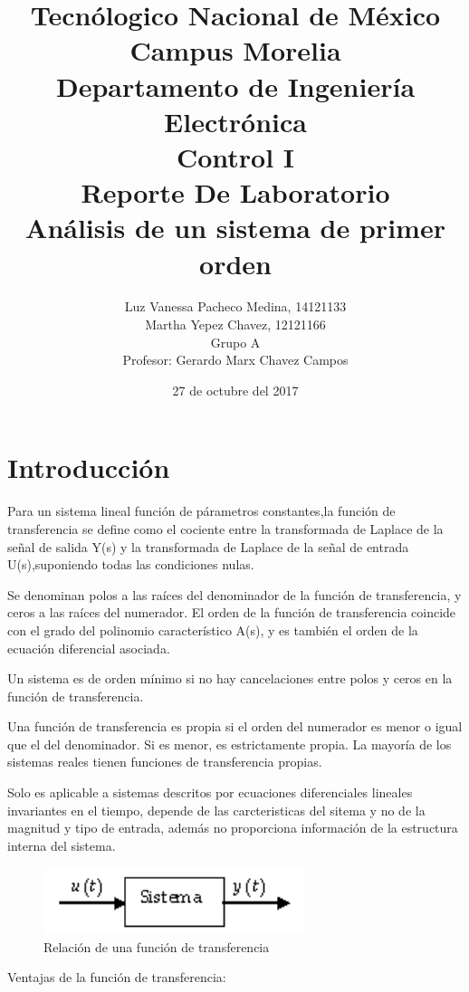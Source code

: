 \documentclass[12pt,letterpaper]{article}     %
\author{Luz Vanessa Pacheco Medina, 14121133 \\ Martha Yepez Chavez, 12121166 \\ {\small Grupo A}\\ Profesor: Gerardo Marx Chavez Campos  \vspace*{3.0in}}
\title{Tecnólogico Nacional de México\\Campus Morelia\\{\small Departamento de Ingeniería Electrónica\\Control I\\\vspace*{0.55in} Reporte De Laboratorio}\\ Análisis de un sistema de primer orden \vspace*{1.35in}}
\date{27 de octubre del 2017}
\begin{document}


\maketitle							%


\tableofcontents
\newpage
\listoffigures

\newpage
\section{Introducción}
Para un sistema lineal función de párametros constantes,la función de transferencia se define como el cociente entre la transformada de Laplace de la señal de salida Y(s) y  la transformada de Laplace de la señal de entrada U(s),suponiendo todas las condiciones nulas. 



Se denominan polos a las raíces del denominador de la función de transferencia, y ceros a las raíces del numerador. El orden de la función de transferencia coincide con el grado del polinomio característico A(s), y es también el orden de la ecuación diferencial asociada.

Un sistema es de orden mínimo si no hay cancelaciones entre polos y ceros en la función de transferencia. 

Una función de transferencia es propia si el orden del numerador es menor o igual que el del denominador. Si es menor, es estrictamente propia. La mayoría de los sistemas reales tienen funciones de transferencia propias. 

Solo es aplicable a sistemas descritos por ecuaciones diferenciales lineales invariantes en el tiempo, depende de las carcteristicas del sitema y no de la magnitud y tipo de entrada, además no proporciona información de la estructura interna del sistema.
\begin{figure}[h!]
\centering
\includegraphics[width=3in]{funciones}
\caption{Relación de una función de transferencia}
\end{figure}

Ventajas de la función de transferencia:
\end{document}
